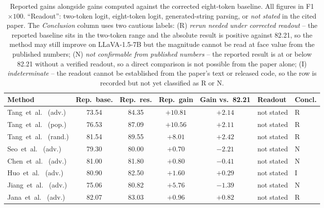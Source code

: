\documentclass[11pt,letterpaper]{article}
\begin{document}
\begin{table}[t]
\caption{Reported gains alongside gains computed against the corrected
eight-token baseline. All figures in F1$\times 100$.
``Readout'': two-token logit, eight-token logit, generated-string
parsing, or \emph{not stated} in the cited paper.
The \emph{Conclusion} column uses two cautious labels:
(R) \emph{rerun needed under corrected readout} -- the reported
baseline sits in the two-token range and the absolute result is
positive against 82.21, so the method may still improve on
LLaVA-1.5-7B but the magnitude cannot be read at face value from the
published numbers;
(N) \emph{not confirmable from published numbers} -- the reported
result is at or below 82.21 without a verified readout, so a direct
comparison is not possible from the paper alone;
(I) \emph{indeterminate} -- the readout cannot be established from the
paper's text or released code, so the row is recorded but not yet
classified as R or N.}
\label{tab:reeval}
\centering
\small
\setlength{\tabcolsep}{4pt}
\begin{tabular}{@{}lccccll@{}}
\toprule
Method & Rep.~base. & Rep.~res. & Rep.~gain & Gain vs.~82.21 & Readout & Concl. \\
\midrule
Tang~et~al.~\citep{visflow2025} (adv.)  & 73.54 & 84.35 & $+10.81$ & $+2.14$ & not stated & R \\
Tang~et~al.~\citep{visflow2025} (pop.)  & 76.53 & 87.09 & $+10.56$ & $+2.11$ & not stated & R \\
Tang~et~al.~\citep{visflow2025} (rand.) & 81.54 & 89.55 & $+8.01$  & $+2.42$ & not stated & R \\
Seo~et~al.~\citep{seo2025} (adv.)       & 79.30 & 80.00 & $+0.70$  & $-2.21$ & not stated & N \\
Chen~et~al.~\citep{adaptvis2025} (adv.) & 81.00 & 81.80 & $+0.80$  & $-0.41$ & not stated & N \\
Huo~et~al.~\citep{huo2024sid} (adv.)    & 80.90 & 82.50 & $+1.60$  & $+0.29$ & not stated & I \\
Jiang~et~al.~\citep{jiang2026pnd} (adv.)& 75.06 & 80.82 & $+5.76$  & $-1.39$ & not stated & N \\
Jana~et~al.~\citep{jana2026bracs} (adv.)& 82.07 & 83.03 & $+0.96$  & $+0.82$ & not stated & R \\
\bottomrule
\end{tabular}
\end{table}
\end{document}
